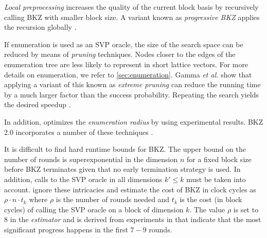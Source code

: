 \textit{Local preprocessing} increases the quality of the current block basis by recursively calling BKZ with smaller block size. A variant known as \textit{progressive BKZ} applies the recursion globally \cite{AWHT16}.

If enumeration is used as an SVP oracle, the size of the search space can be reduced by means of \textit{pruning} techniques. Nodes closer to the edges of the enumeration tree are less likely to represent in short lattice vectors. For more details on enumeration, we refer to \cref{sec:enumeration}. Gamma \textit{et al.} show that applying a variant of this known as \textit{extreme pruning} can reduce the running time by a much larger factor than the success probability. Repeating the search yields the desired speedup \cite{GNR10}.

In addition, \cite{CN11} optimizes the \textit{enumeration radius} by using experimental results. BKZ 2.0 incorporates a number of these techniques \cite{CN11}.


It is difficult to find hard runtime bounds for BKZ. The upper bound on the number of rounds is superexponential in the dimension $n$ for a fixed block size \cite{HPS11a, GN08b} before BKZ terminates given that no early termination strategy is used. In addition, calls to the SVP oracle in all dimensions $k' \leq k$ must be taken into account.
\citet{APS15} ignore these intricacies and estimate the cost of BKZ in clock cycles as $\rho \cdot n \cdot t_k$ where $\rho$ is the number of rounds needed and $t_k$ is the cost (in block cycles) of calling the SVP oracle on a block of dimension $k$. The value $\rho$ is set to $8$ in the \textit{estimator} and is derived from experiments in \cite{Chen13} that indicate that the most significant progress happens in the first $7-9$ rounds. \label{sec:bkz-8d}

